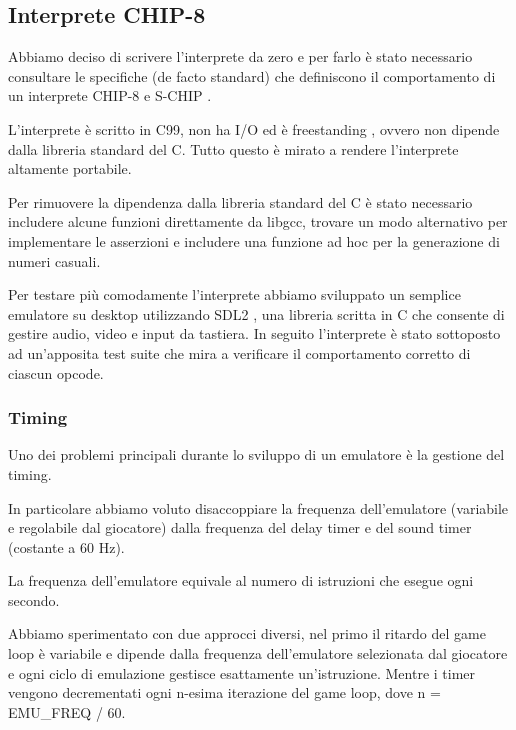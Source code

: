 \documentclass[a4paper]{article}
\begin{document}
\subsection{Interprete CHIP-8}

Abbiamo deciso di scrivere l'interprete da zero e per farlo è
stato necessario consultare le specifiche (de facto standard)
che definiscono il comportamento di un interprete
CHIP-8 \cite{cowgod:chip8} e S-CHIP \cite{cowgod:schip}.

L'interprete è scritto in C99, non ha I/O ed è freestanding
\cite{n1256:conformance}, ovvero non dipende dalla libreria
standard del C. Tutto questo è mirato a rendere l'interprete
altamente portabile.

Per rimuovere la dipendenza dalla libreria standard del C è stato
necessario includere alcune funzioni direttamente da libgcc, trovare
un modo alternativo per implementare le asserzioni e includere una
funzione ad hoc per la generazione di numeri casuali.


Per testare più comodamente l'interprete abbiamo sviluppato
un semplice emulatore su desktop utilizzando SDL2
\cite{libsdl:about}, una libreria scritta in C che consente di
gestire audio, video e input da tastiera.
In seguito l'interprete è stato sottoposto ad un'apposita
test suite \cite{github:chip8-test-suite} che mira a verificare
il comportamento corretto di ciascun opcode.

\subsubsection{Timing}


Uno dei problemi principali durante lo sviluppo di un emulatore è
la gestione del timing.

In particolare abbiamo voluto disaccoppiare la frequenza
dell'emulatore (variabile e regolabile dal giocatore) dalla
frequenza del delay timer e del sound timer (costante a 60 Hz).

La frequenza dell'emulatore equivale al numero di istruzioni che
esegue ogni secondo.

Abbiamo sperimentato con due approcci diversi, nel primo il ritardo
del game loop è variabile e dipende dalla frequenza
dell'emulatore selezionata dal giocatore e ogni ciclo di emulazione
gestisce esattamente un'istruzione.
Mentre i timer vengono decrementati ogni n-esima iterazione del game
loop, dove n = EMU\_FREQ / 60.
\end{document}
